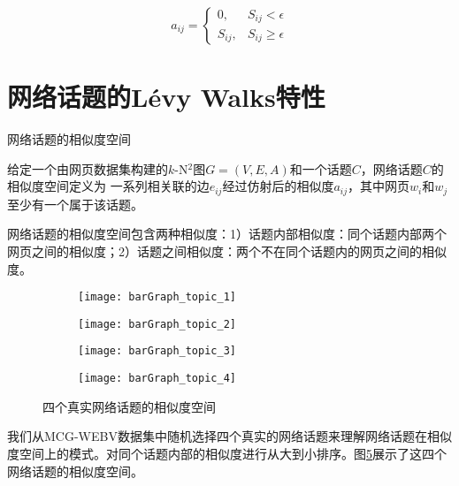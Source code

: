 \begin{equation}\label{eq:filtergraph}
a_{ij} =
\begin{cases}
0, & S_{ij} < \epsilon \\
S_{ij}, & S_{ij} \geq \epsilon
\end{cases}
\end{equation}


\section{网络话题的L\'{e}vy Walks特性}

\begin{definition}
    网络话题的相似度空间

    给定一个由网页数据集构建的$k$-N$^2$图$G=(V,E,A)$和一个话题$C$，网络话题$C$的相似度空间定义为
    一系列相关联的边$e_{ij}$经过仿射后的相似度$a_{ij}$，其中网页$w_i$和$w_j$至少有一个属于该话题。
\end{definition}

网络话题的相似度空间包含两种相似度：1）话题内部相似度：同个话题内部两个网页之间的相似度；2）话题之间相似度：两个不在同个话题内的网页之间的相似度。

\begin{figure}[!htbp]
    \centering
    \begin{subfigure}[b]{0.5\textwidth}
      \texttt{[image: barGraph\_topic\_1]}
      \caption{}
      \label{fig:barGraph_t1}
    \end{subfigure}%
    \begin{subfigure}[b]{0.5\textwidth}
      \texttt{[image: barGraph\_topic\_2]}
      \caption{}
      \label{fig:barGraph_t2}
    \end{subfigure}
    \begin{subfigure}[b]{0.5\textwidth}
      \texttt{[image: barGraph\_topic\_3]}
      \caption{}
      \label{fig:barGraph_t3}
    \end{subfigure}%
    \begin{subfigure}[b]{0.5\textwidth}
      \texttt{[image: barGraph\_topic\_4]}
      \caption{}
      \label{fig:barGraph_t4}
    \end{subfigure}
    \caption{四个真实网络话题的相似度空间}
    \label{fig:barGraph}
\end{figure}
我们从MCG-WEBV数据集中随机选择四个真实的网络话题来理解网络话题在相似度空间上的模式。对同个话题内部的相似度进行从大到小排序。图\ref{fig:barGraph}展示了这四个网络话题的相似度空间。


